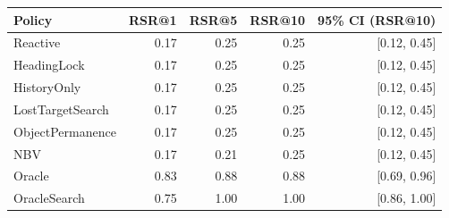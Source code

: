 \begin{tabular}{lrrrr}
\toprule
Policy & RSR@1 & RSR@5 & RSR@10 & 95\% CI (RSR@10) \\
\midrule
Reactive & 0.17 & 0.25 & 0.25 & [0.12, 0.45] \\
HeadingLock & 0.17 & 0.25 & 0.25 & [0.12, 0.45] \\
HistoryOnly & 0.17 & 0.25 & 0.25 & [0.12, 0.45] \\
LostTargetSearch & 0.17 & 0.25 & 0.25 & [0.12, 0.45] \\
ObjectPermanence & 0.17 & 0.25 & 0.25 & [0.12, 0.45] \\
NBV & 0.17 & 0.21 & 0.25 & [0.12, 0.45] \\
Oracle & 0.83 & 0.88 & 0.88 & [0.69, 0.96] \\
OracleSearch & 0.75 & 1.00 & 1.00 & [0.86, 1.00] \\
\bottomrule
\end{tabular}
